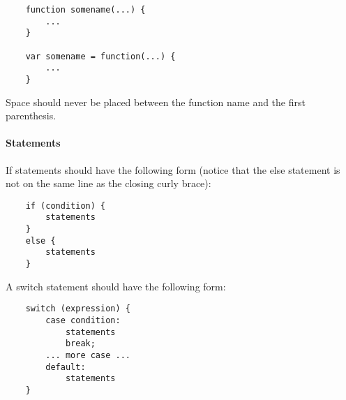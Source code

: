 \begin{lstlisting}
	function somename(...) {
		...
	}

	var somename = function(...) {
		...
	}
\end{lstlisting}

Space should never be placed between the function name and the first parenthesis.

\paragraph{Statements} \hspace{1mm}

If statements should have the following form (notice that the else statement is
not on the same line as the closing curly brace):

\begin{lstlisting}
	if (condition) {
		statements
	}
	else {
		statements
	}
\end{lstlisting}

A switch statement should have the following form:

\begin{lstlisting}
	switch (expression) {
		case condition:
			statements
			break;
		... more case ...
		default:
			statements
	}
\end{lstlisting}

